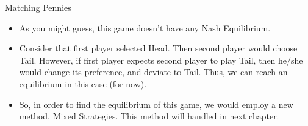 \documentclass[
  ignorenonframetext,
]{beamer}
\begin{document}
\begin{frame}{Matching Pennies}
\protect\hypertarget{matching-pennies-1}{}
\begin{itemize}
  \item As you might guess, this game doesn't have any Nash Equilibrium.
  \item Consider that first player selected Head. Then second player would choose Tail. However, if first player expects second player to play Tail, then he/she would change its preference, and deviate to Tail. Thus, we can reach an equilibrium in this case (for now).
  \item So, in order to find the equilibrium of this game, we would employ a new method, Mixed Strategies. This method will handled in next chapter.
\end{itemize}
\end{frame}
\end{document}
